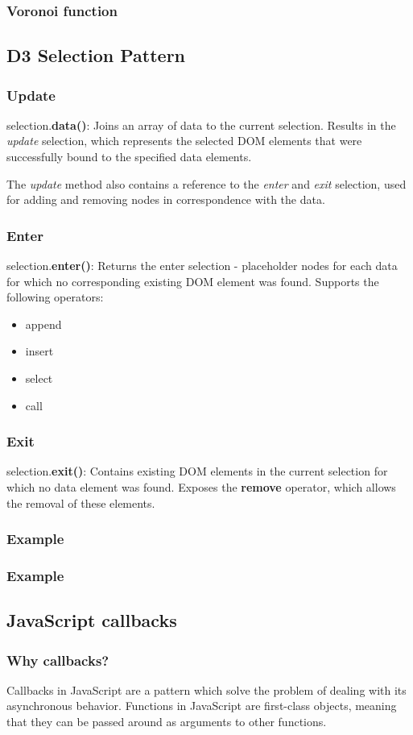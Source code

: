 \documentclass[red]{beamer}
\begin{document}
\begin{frame}
  \frametitle{Voronoi function}
  \lstv
\end{frame}

\subsection{D3 Selection Pattern}
\begin{frame}
  \frametitle{Update}
  selection.\textbf{data()}: Joins an array of data to the current selection. Results in the \textit{update} selection, which represents the selected DOM elements that were successfully bound to the specified data elements.
  \newline

  The \textit{update} method also contains a reference to the \textit{enter} and \textit{exit} selection, used for adding and removing nodes in correspondence with the data.
\end{frame}

\begin{frame}
  \frametitle{Enter}
  selection.\textbf{enter()}: Returns the enter selection - placeholder nodes for each data for which no corresponding existing DOM element was found. Supports the following operators:
  \begin{itemize}
  \item<1->append
  \item<2->insert
  \item<3->select
  \item<4->call
  \end{itemize}

\end{frame}

\begin{frame}
  \frametitle{Exit}
  selection.\textbf{exit()}: Contains existing DOM elements in the current selection for which no data element was found. Exposes the \textbf{remove} operator, which allows the removal of these elements. 
\end{frame}

\begin{frame}
  \frametitle{Example}
  \lstexit
\end{frame}

\begin{frame}
  \frametitle{Example}
  \lstexitl
\end{frame}

\subsection{JavaScript callbacks}
\begin{frame}
  \frametitle{Why callbacks?}
  Callbacks in JavaScript are a pattern which solve the problem of dealing with its asynchronous behavior. Functions in JavaScript are first-class objects, meaning that they can be passed around as arguments to other functions. 

  \lstcallback
\end{frame}
\end{document}
